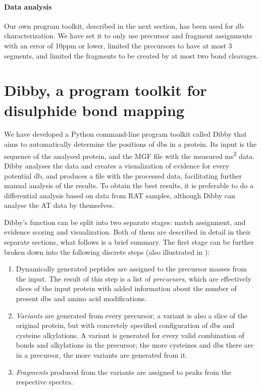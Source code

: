 \paragraph{Data analysis} Our own program toolkit, described in the next section, has been used for \gls*{db} characterization. We have set it to only use precursor and fragment assignments with an error of 10ppm or lower, limited the precursors to have at most 3 segments, and limited the fragments to be created by at most two bond cleavages.

\section{Dibby, a program toolkit for disulphide bond mapping}

We have developed a Python command-line program toolkit called Dibby that aims to automatically determine the positions of \glspl*{db} in a protein. Its input is the sequence of the analysed protein, and the MGF file with the measured \gls*{ms}\textsuperscript{2} data. Dibby analyses the data and creates a visualization of evidence for every potential \gls*{db}, and produces a file with the processed data, facilitating further manual analysis of the results. To obtain the best results, it is preferable to do a differential analysis based on data from RAT samples, although Dibby can analyse the AT data by themselves.

Dibby's function can be split into two separate stages: match assignment, and evidence scoring and visualization. Both of them are described in detail in their separate sections, what follows is a brief summary. The first stage can be further broken down into the following discrete steps (also illustrated in ):

\begin{enumerate}
  \item Dynamically generated peptides are assigned to the precursor masses from the input. The result of this step is a list of \emph{precursors}, which are effectively slices of the input protein with added information about the number of present \glspl*{db} and amino acid modifications.
  \item \emph{Variants} are generated from every precursor; a variant is also a slice of the original protein, but with concretely specified configuration of \glspl*{db} and cysteine alkylations. A variant is generated for every valid combination of bonds and alkylations in the precursor; the more cysteines and \glspl*{db} there are in a precursor, the more variants are generated from it.
  \item \emph{Fragments} produced from the variants are assigned to peaks from the respective spectra.
\end{enumerate}

